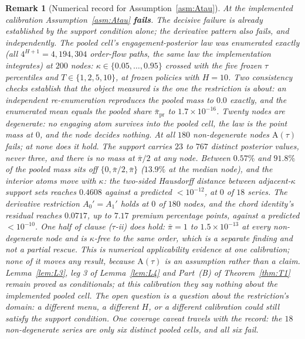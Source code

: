 \documentclass[11pt]{article}
\newtheorem{remark}{Remark}
\newcommand{\Atau}{\mathrm{A}(\tau)}
\begin{document}
\begin{remark}[Numerical record for Assumption~\ref{asm:Atau}]
\label{rem:AtauRecord}
At the implemented calibration Assumption~\ref{asm:Atau} \textbf{fails}. The decisive failure is
already established by the support condition alone; the derivative pattern also fails, and
independently. The pooled cell's engagement-posterior law was enumerated exactly (all
$4^{H+1} = 4{,}194{,}304$ order-flow paths, the same law the implementation integrates) at $200$
nodes: $\kappa \in \{0.05,\dots,0.95\}$ crossed with the five frozen $\tau$ percentiles and
$T \in \{1,2,5,10\}$, at frozen policies with $H = 10$. Two consistency checks establish that the
object measured is the one the restriction is about: an independent re-enumeration reproduces the pooled mass to
$0.0$ exactly, and the enumerated mean equals the pooled share $\bar\pi_{\mathrm{pr}}$ to
$1.7\times10^{-16}$. Twenty nodes are degenerate: no engaging atom survives into the pooled cell,
the law is the point mass at $0$, and the node decides nothing. At all $180$ non-degenerate nodes
$\Atau$ fails; at none does it hold. The support carries $23$ to $767$ distinct posterior values,
never three, and there is no mass at $\bar\pi/2$ at any node. Between $0.57\%$ and $91.8\%$ of the
pooled mass sits off $\{0,\bar\pi/2,\bar\pi\}$ ($13.9\%$ at the median node), and the interior
atoms move with $\kappa$: the two-sided Hausdorff distance between adjacent-$\kappa$ support sets
reaches $0.4608$ against a predicted $<10^{-12}$, at $0$ of $18$ series. The derivative restriction
$A_0' = A_1'$ holds at $0$ of $180$ nodes, and the chord identity's residual reaches $0.0717$, up
to $7.17$ premium percentage points, against a predicted $<10^{-10}$. One half of clause
($\tau$-ii) does hold: $\bar\pi = 1$ to $1.5\times10^{-13}$ at every non-degenerate node and is
$\kappa$-free to the same order, which is a separate finding and not a partial rescue. This is
numerical applicability evidence at one calibration; none of it moves any result,
because $\Atau$ is an assumption rather than a claim. Lemma~\ref{lem:L3}, leg 3 of
Lemma~\ref{lem:L4} and Part~(B) of Theorem~\ref{thm:T1} remain proved as conditionals; at this
calibration they say nothing about the implemented pooled cell. The open
question is a question about the restriction's \emph{domain}: a different menu, a different $H$, or a
different calibration could still satisfy the support condition. One coverage caveat travels with
the record: the $18$ non-degenerate series are only \emph{six distinct pooled cells}, and all six
fail.
\end{remark}
\end{document}
